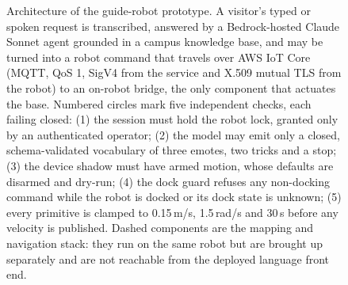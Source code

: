 \begin{figure}[t]
\caption{Architecture of the guide-robot prototype. A visitor's typed or spoken
request is transcribed, answered by a Bedrock-hosted Claude Sonnet agent grounded
in a campus knowledge base, and may be turned into a robot command that travels
over AWS IoT Core (MQTT, QoS 1, SigV4 from the service and X.509 mutual TLS from
the robot) to an on-robot bridge, the only component that actuates the base.
Numbered circles mark five independent checks, each failing closed: (1) the
session must hold the robot lock, granted only by an authenticated operator;
(2) the model may emit only a closed, schema-validated vocabulary of three
emotes, two tricks and a stop; (3) the device shadow must have armed motion,
whose defaults are disarmed and dry-run; (4) the dock guard refuses any
non-docking command while the robot is docked or its dock state is unknown;
(5) every primitive is clamped to 0.15\,m/s, 1.5\,rad/s and 30\,s before any
velocity is published. Dashed components are the mapping and navigation stack: they run
on the same robot but are brought up separately and are not reachable from the
deployed language front end.}
\label{fig:prototype}
\end{figure}
